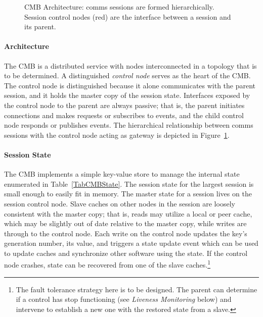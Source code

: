 \begin{figure}
\begin{minipage}[b]{0.2\linewidth}
\end{minipage}
\hspace{0.5cm}
\begin{minipage}[b]{0.2\linewidth}
\end{minipage}
\hspace{0.5cm}
\begin{minipage}[b]{0.2\linewidth}
\end{minipage}
\hspace{0.5cm}
\begin{minipage}[b]{0.2\linewidth}
\end{minipage}
\caption{CMB Architecture:  comms sessions are formed hierarchically.
Session control nodes (red) are the interface between a session and its parent.}
\label{FigCommsEx1}
\end{figure}

\paragraph{Architecture}
The CMB is a distributed service with nodes interconnected in a topology
that is to be determined.
A distinguished {\em control node} serves as the heart of the CMB.
The control node is distinguished because it alone communicates with
the parent session, and it holds the master copy of the session state.
Interfaces exposed by the control node to the parent are always passive;
that is, the parent initiates connections and makes requests or subscribes
to events, and the child control node responds or publishes events.
The hierarchical relationship between comms sessions with the control
node acting as gateway is depicted in Figure~\ref{FigCommsEx1}.

\paragraph{Session State}
The CMB implements a simple key-value store to manage the
internal state enumerated in Table~\ref{TabCMBState}.
The session state for the largest session is small enough to easily
fit in memory.
The master state for a session lives on the session control node.
Slave caches on other nodes in the session are loosely consistent with
the master copy; that is, reads may utilize a local or peer cache,
which may be slightly out of date relative to the master copy,
while writes are through to the control node.
Each write on the control node updates the key's generation number,
its value, and triggers a state update event which
can be used to update caches and synchronize other software using the
state.  If the control node crashes, state can be recovered from
one of the slave caches.\footnote{The fault tolerance strategy here is to
be designed.  The parent can determine if a control has stop functioning
(see {\em Liveness Monitoring} below) and intervene to establish a new one
with the restored state from a slave.}

